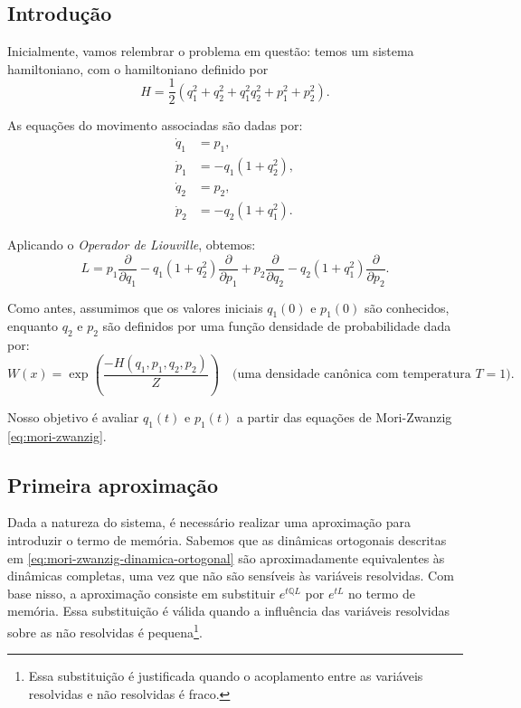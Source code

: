 \subsection{Introdução}
Inicialmente, vamos relembrar o problema em questão: temos um sistema hamiltoniano, com o hamiltoniano definido por  
\begin{equation*}
	H = \frac{1}{2}(q_1^2 + q_2^2 + q_1^2 q_2^2 + p_1^2 + p_2^2).
\end{equation*}

As equações do movimento associadas são dadas por:  
\begin{align*}
	\dot{q}_1 & = p_1, \nonumber             \\
	\dot{p}_1 & = -q_1(1 + q_2^2), \nonumber \\
	\dot{q}_2 & = p_2, \nonumber             \\
	\dot{p}_2 & = -q_2(1 + q_1^2).           
\end{align*}

Aplicando o \textit{Operador de Liouville}, obtemos:  
\begin{equation*}
	L = p_1 \frac{\partial}{\partial q_1} - q_1(1 + q_2^2)\frac{\partial}{\partial p_1}
	+ p_2 \frac{\partial}{\partial q_2} - q_2(1 + q_1^2)\frac{\partial}{\partial p_2}.
\end{equation*}

Como antes, assumimos que os valores iniciais $q_1(0)$ e $p_1(0)$ são conhecidos, enquanto $q_2$ e $p_2$ são definidos por uma função densidade de probabilidade dada por:
\begin{equation*}
	W(x) = \exp\left(\frac{-H(q_1,p_1,q_2,p_2)}{Z}\right) \quad \text{(uma densidade canônica com temperatura $T = 1$).}
\end{equation*}

Nosso objetivo é avaliar $q_1(t)$ e $p_1(t)$ a partir das equações de Mori-Zwanzig \eqref{eq:mori-zwanzig}.

\subsection{Primeira aproximação}
Dada a natureza do sistema, é necessário realizar uma aproximação para introduzir o termo de memória. Sabemos que as dinâmicas ortogonais descritas em \eqref{eq:mori-zwanzig-dinamica-ortogonal} são aproximadamente equivalentes às dinâmicas completas, uma vez que não são sensíveis às variáveis resolvidas. Com base nisso, a aproximação consiste em substituir $e^{t\mathbb{Q}L}$ por $e^{tL}$ no termo de memória. Essa substituição é válida quando a influência das variáveis resolvidas sobre as não resolvidas é pequena\footnote{Essa substituição é justificada quando o acoplamento entre as variáveis resolvidas e não resolvidas é fraco.}. 

